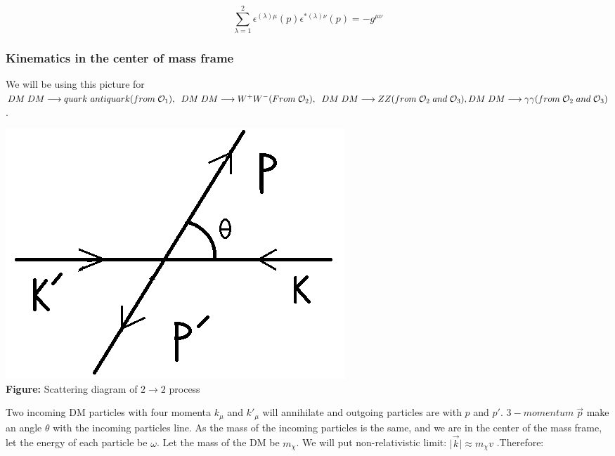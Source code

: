 \documentclass[12pt]{report}
\begin{document}
$$\sum_{\lambda=1}^2 \epsilon^{(\lambda) \mu}(p) \epsilon^{*(\lambda) \nu}(p) = - g^{\mu \nu}$$






\subsubsection{Kinematics in the center of mass frame}

We will be using this picture for $ DM\;DM \longrightarrow quark\ antiquark (from\; \mathcal{O}_1 ), \\ \; \; DM\; DM \longrightarrow W^+W^-(From\; \mathcal{O}_2 ), \; \; DM\; DM \longrightarrow ZZ (from\; \mathcal{O}_2 \; and\; \mathcal{O}_3 ), \;\\ DM\; DM \longrightarrow \gamma  \gamma (from\; \mathcal{O}_2  \; and\; \mathcal{O}_3 )$ .


\begin{center}
\includegraphics[scale=0.3]{kinematics.png}\\
\textbf{Figure:} Scattering diagram of $2 \longrightarrow 2$ process
\end{center}

Two incoming DM particles with four momenta $k_\mu$ and $k\prime_\mu$ will annihilate and outgoing particles are with $p$ and $p\prime$. $3-momentum\; \vec{p}$ make an angle $\theta$ with the incoming particles line. As the mass of the incoming particles is the same, and we are in the center of the mass frame, let the energy of each particle be $\omega$. Let the mass of the DM be $m_\chi$. We will put non-relativistic limit: $\mid \vec{k} \mid \approx m_\chi v$
 .Therefore:
\end{document}
